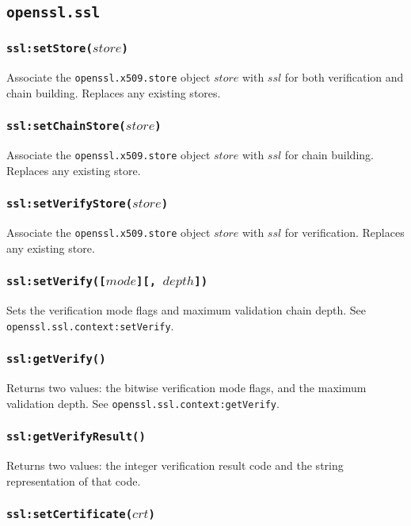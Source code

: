 \documentclass[11pt, oneside]{memoir}
\newcommand*{\fn}[1]{\texttt{#1}\xspace}
\newcommand*{\module}[1]{\texttt{#1}\xspace}
\newcounter{toccols}
\newenvironment{Module}[1]{
	\subsection{\texttt{#1}}
	\addtocontents{toc}{
		\protect\begin{multicols}{\value{toccols}}
	}
}{
	\addtocontents{toc}{\protect\end{multicols}}
}
\begin{document}
\begin{Module}{openssl.ssl}
\subsubsection[\fn{ssl:setStore}]{\fn{ssl:setStore($store$)}}

Associate the \module{openssl.x509.store} object $store$ with $ssl$ for both verification and chain building. Replaces any existing stores.

\subsubsection[\fn{ssl:setChainStore}]{\fn{ssl:setChainStore($store$)}}

Associate the \module{openssl.x509.store} object $store$ with $ssl$ for chain building. Replaces any existing store.

\subsubsection[\fn{ssl:setVerifyStore}]{\fn{ssl:setVerifyStore($store$)}}

Associate the \module{openssl.x509.store} object $store$ with $ssl$ for verification. Replaces any existing store.

\subsubsection[\fn{ssl:setVerify}]{\fn{ssl:setVerify([$mode$][, $depth$])}}

Sets the verification mode flags and maximum validation chain depth.
See \fn{openssl.ssl.context:setVerify}.

\subsubsection[\fn{ssl:getVerify}]{\fn{ssl:getVerify()}}

Returns two values: the bitwise verification mode flags, and the maximum validation depth.
See \fn{openssl.ssl.context:getVerify}.

\subsubsection[\fn{ssl:getVerifyResult}]{\fn{ssl:getVerifyResult()}}

Returns two values: the integer verification result code and the string representation of that code.

\subsubsection[\fn{ssl:setCertificate}]{\fn{ssl:setCertificate($crt$)}}


\end{Module}
\end{document}
